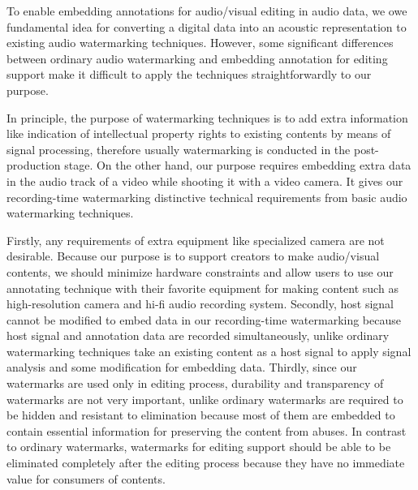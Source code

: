 To enable embedding annotations for audio/visual editing in audio data, we owe fundamental idea for converting a digital data into an acoustic representation to existing audio watermarking techniques.
However, some significant differences between ordinary audio watermarking and embedding annotation for editing support make it difficult to apply the techniques straightforwardly to our purpose.

In principle, the purpose of watermarking techniques is to add extra information like indication of intellectual property rights to existing contents by means of signal processing, therefore usually watermarking is conducted in the post-production stage.
On the other hand, our purpose requires embedding extra data in the audio track of a video while shooting it with a video camera. %
It gives our recording-time watermarking distinctive technical requirements from basic audio watermarking techniques.

Firstly, any requirements of extra equipment like specialized camera are not desirable.
Because our purpose is to support creators to make audio/visual contents, we should minimize hardware constraints and allow users to use our annotating technique with their favorite equipment for making content such as high-resolution camera and hi-fi audio recording system.
Secondly, host signal cannot be modified to embed data in our recording-time watermarking because host signal and annotation data are recorded simultaneously, unlike ordinary watermarking techniques take an existing content as a host signal to apply signal analysis and some modification for embedding data.
Thirdly, since our watermarks are used only in editing process, durability and transparency of watermarks are not very important, unlike ordinary watermarks are required to be hidden and resistant to elimination because most of them are embedded to contain essential information for preserving the content from abuses.
In contrast to ordinary watermarks, watermarks for editing support should be able to be eliminated completely after the editing process because they have no immediate value for consumers of contents.

